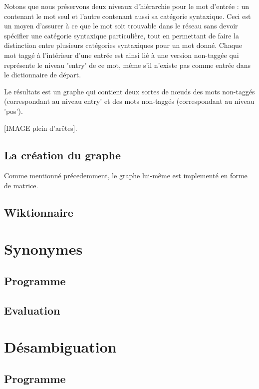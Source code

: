 \documentclass[a4paper, 12pt]{article}
\begin{document}
Notons que nous préservons deux niveaux d'hiérarchie pour le mot d'entrée : un 
contenant le mot seul et l'autre contenant aussi sa catégorie syntaxique. Ceci 
est un moyen d'assurer à ce que le mot soit trouvable dans le réseau sans devoir 
spécifier une catégorie syntaxique particulière, tout en permettant de faire la 
distinction entre plusieurs catégories syntaxiques pour un mot donné. Chaque mot 
taggé à l'intérieur d'une entrée est ainsi lié à une version non-taggée qui 
représente le niveau 'entry' de ce mot, même s'il n'existe pas comme entrée dans 
le dictionnaire de départ.

Le résultats est un graphe qui contient deux sortes de nœuds des mots non-taggés 
(correspondant au niveau entry' et des mots non-taggés (correspondant au niveau 
'pos').

[IMAGE plein d'arêtes].

\subsection{La création du graphe}
Comme mentionné précedemment, le graphe lui-même est implementé en forme de 
matrice.

\subsection{Wiktionnaire}




\section{Synonymes}
\subsection{Programme}

\subsection{Evaluation}

\section{Désambiguation}
\subsection{Programme}
\end{document}
